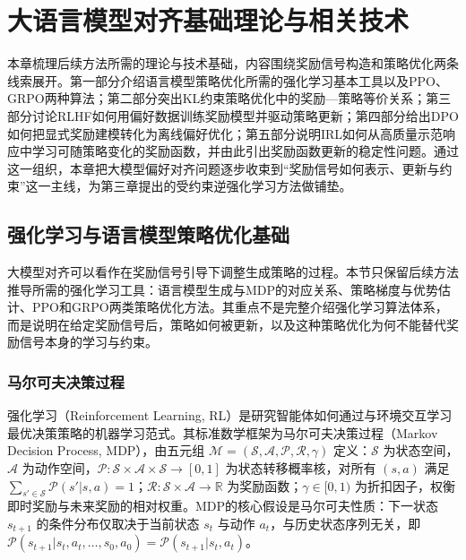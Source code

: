 
\chapter{大语言模型对齐基础理论与相关技术}

本章梳理后续方法所需的理论与技术基础，内容围绕奖励信号构造和策略优化两条线索展开。第一部分介绍语言模型策略优化所需的强化学习基本工具以及PPO、GRPO两种算法；第二部分突出KL约束策略优化中的奖励—策略等价关系；第三部分讨论RLHF如何用偏好数据训练奖励模型并驱动策略更新；第四部分给出DPO如何把显式奖励建模转化为离线偏好优化；第五部分说明IRL如何从高质量示范响应中学习可随策略变化的奖励函数，并由此引出奖励函数更新的稳定性问题。通过这一组织，本章把大模型偏好对齐问题逐步收束到“奖励信号如何表示、更新与约束”这一主线，为第三章提出的受约束逆强化学习方法做铺垫。

\section{强化学习与语言模型策略优化基础}

大模型对齐可以看作在奖励信号引导下调整生成策略的过程。本节只保留后续方法推导所需的强化学习工具：语言模型生成与MDP的对应关系、策略梯度与优势估计、PPO和GRPO两类策略优化方法。其重点不是完整介绍强化学习算法体系，而是说明在给定奖励信号后，策略如何被更新，以及这种策略优化为何不能替代奖励信号本身的学习与约束。

\subsection{马尔可夫决策过程}

强化学习（Reinforcement Learning, RL）是研究智能体如何通过与环境交互学习最优决策策略的机器学习范式\cite{sutton1999policy}。其标准数学框架为马尔可夫决策过程（Markov Decision Process, MDP），由五元组 $\mathcal{M} = (\mathcal{S}, \mathcal{A}, \mathcal{P}, \mathcal{R}, \gamma)$ 定义：$\mathcal{S}$ 为状态空间，$\mathcal{A}$ 为动作空间，$\mathcal{P}: \mathcal{S} \times \mathcal{A} \times \mathcal{S} \to [0,1]$ 为状态转移概率核，对所有 $(s,a)$ 满足 $\sum_{s' \in \mathcal{S}} \mathcal{P}(s'|s,a) = 1$；$\mathcal{R}: \mathcal{S} \times \mathcal{A} \to \mathbb{R}$ 为奖励函数；$\gamma \in [0,1)$ 为折扣因子，权衡即时奖励与未来奖励的相对权重。MDP的核心假设是马尔可夫性质：下一状态 $s_{t+1}$ 的条件分布仅取决于当前状态 $s_t$ 与动作 $a_t$，与历史状态序列无关，即 $\mathcal{P}(s_{t+1}|s_t,a_t,\ldots,s_0,a_0) = \mathcal{P}(s_{t+1}|s_t,a_t)$。

